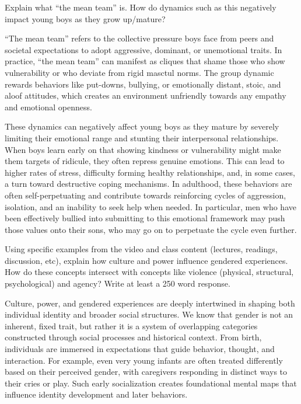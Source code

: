 \documentclass{article}
\begin{document}
\begin{prompt}
  Explain what ``the mean team'' is. How do dynamics such as this negatively impact young boys as they grow up/mature?
\end{prompt}

``The mean team'' refers to the collective pressure boys face from peers and societal expectations to adopt aggressive, dominant, or unemotional traits.
In practice, ``the mean team'' can manifest as cliques that shame those who show vulnerability or who deviate from rigid masctul norms.
The group dynamic rewards behaviors like put-downs, bullying, or emotionally distant, stoic, and aloof attitudes, which creates an environment unfriendly towards any empathy and emotional openness.

These dynamics can negatively affect young boys as they mature by severely limiting their emotional range and stunting their interpersonal relationships.
When boys learn early on that showing kindness or vulnerability might make them targets of ridicule, they often repress genuine emotions.
This can lead to higher rates of stress, difficulty forming healthy relationships, and, in some cases, a turn toward destructive coping mechanisms.
In adulthood, these behaviors are often self-perpetuating and contribute towards reinforcing cycles of aggression, isolation, and an inability to seek help when needed.
In particular, men who have been effectively bullied into submitting to this emotional framework may push those values onto their sons, who may go on to perpetuate the cycle even further.

\begin{prompt}
  Using specific examples from the video and class content (lectures, readings, discussion, etc), explain how culture and power influence gendered experiences. How do these concepts intersect with concepts like violence (physical, structural, psychological) and agency? Write at least a 250 word response.
\end{prompt}

Culture, power, and gendered experiences are deeply intertwined in shaping both individual identity and broader social structures.
We know that gender is not an inherent, fixed trait, but rather it is a system of overlapping categories constructed through social processes and historical context.
From birth, individuals are immersed in expectations that guide behavior, thought, and interaction.
For example, even very young infants are often treated differently based on their perceived gender, with caregivers responding in distinct ways to their cries or play.
Such early socialization creates foundational mental maps that influence identity development and later behaviors.
\end{document}
